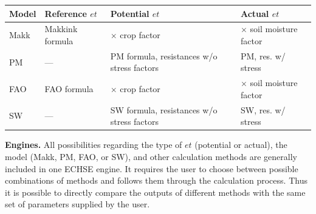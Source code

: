 \documentclass{scrreprt}
\begin{document}
%
%
%  
%
\begin{table}[H]
  \centering
  \begin{tabular*}{1.0\hsize}{llll}
    Model & Reference $et$  & Potential $et$                             & Actual $et$ \\
    \hline
    Makk  & Makkink formula & $\times$ crop factor                       & $\times$ soil moisture factor \\
    PM    & ---             & PM formula, resistances w/o stress factors & PM, res. w/ stress \\
    FAO   & FAO formula     & $\times$ crop factor                       & $\times$ soil moisture factor \\
    SW    & ---             & SW formula, resistances w/o stress factors & SW, res. w/ stress \\
  \end{tabular*}
  \label{tab:models}
\end{table}

\noindent
\textbf{Engines.}
All possibilities regarding the type of $et$ (potential or actual), the model (Makk, PM, FAO, or SW), and other calculation methods are generally included in one ECHSE engine.
It requires the user to choose between possible combinations of methods and follows them through the calculation process.
Thus it is possible to directly compare the outputs of different methods with the same set of parameters supplied by the user.
\end{document}
